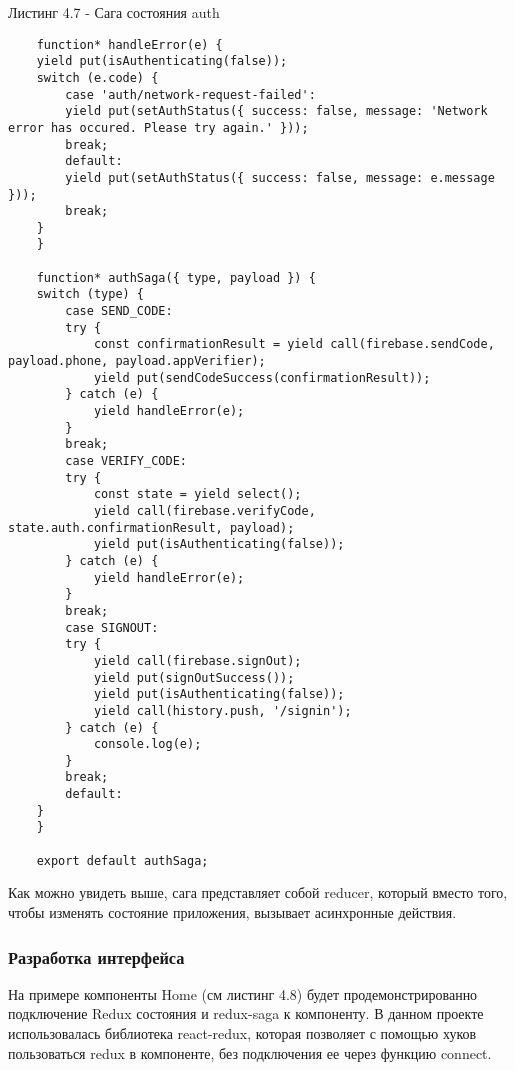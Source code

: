 Листинг 4.7 - Сага состояния auth
\begin{lstlisting}
    function* handleError(e) {
    yield put(isAuthenticating(false));
    switch (e.code) {
        case 'auth/network-request-failed':
        yield put(setAuthStatus({ success: false, message: 'Network error has occured. Please try again.' }));
        break;
        default:
        yield put(setAuthStatus({ success: false, message: e.message }));
        break;
    }
    }

    function* authSaga({ type, payload }) {
    switch (type) {
        case SEND_CODE:
        try {
            const confirmationResult = yield call(firebase.sendCode, payload.phone, payload.appVerifier);
            yield put(sendCodeSuccess(confirmationResult));
        } catch (e) {
            yield handleError(e);
        }
        break;
        case VERIFY_CODE:
        try {
            const state = yield select();
            yield call(firebase.verifyCode, state.auth.confirmationResult, payload);
            yield put(isAuthenticating(false));
        } catch (e) {
            yield handleError(e);
        }
        break;
        case SIGNOUT:
        try {
            yield call(firebase.signOut);
            yield put(signOutSuccess());
            yield put(isAuthenticating(false));
            yield call(history.push, '/signin');
        } catch (e) {
            console.log(e);
        }
        break;
        default:
    }
    }

    export default authSaga;
\end{lstlisting}

Как можно увидеть выше, сага представляет собой reducer, который вместо того, чтобы изменять состояние приложения, вызывает асинхронные действия.

\subsubsection{Разработка интерфейса}\hfill

На примере компоненты Home (см листинг 4.8) будет продемонстрированно подключение Redux состояния и redux-saga к компоненту.
В данном проекте использовалась библиотека react-redux, которая позволяет с помощью хуков пользоваться redux в компоненте, без подключения ее через функцию connect.

